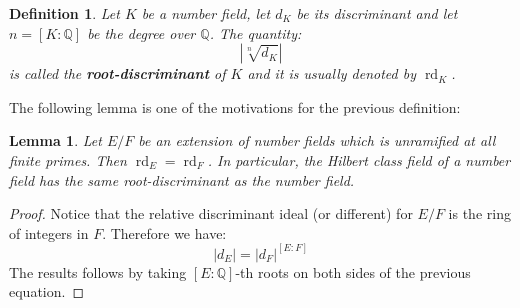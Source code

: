 \documentclass[12pt]{article}
\newtheorem{defn}{Definition}
\newtheorem{lemma}{Lemma}
\newcommand{\Rats}{\mathbb{Q}}
\newcommand{\rd}{\operatorname{rd}}
\begin{document}
\begin{defn}
Let $K$ be a number field, let $d_K$ be its discriminant and let $n=[K:\Rats]$ be the degree over $\Rats$. The quantity:
$$|\sqrt[n]{d_K}|$$
is called the {\bf root-discriminant} of $K$ and it is usually denoted by $\operatorname{rd}_K$.
\end{defn}

The following lemma is one of the motivations for the previous definition:

\begin{lemma}
Let $E/F$ be an extension of number fields which is unramified at all finite primes. Then $\rd_E=\rd_F$. In particular, the Hilbert class field of a number field has the same root-discriminant as the number field.
\end{lemma}

\begin{proof}
Notice that the relative discriminant ideal (or different) for $E/F$ is the ring of integers in $F$. Therefore we have:
$$|d_E|=|d_F|^{[E:F]}$$
The results follows by taking $[E:\Rats]$-th roots on both sides of the previous equation.
\end{proof}
\end{document}
